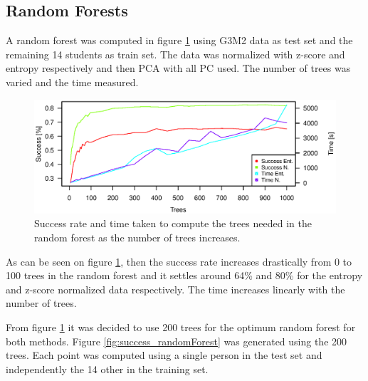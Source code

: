 \subsection{Random Forests}

A random forest was computed in figure \ref{fig:success_time_vs_trees_randomForest} using G3M2 data as test set and the remaining 14 students as train set. 
The data was normalized with z-score and entropy respectively and then PCA with all PC used.
The number of trees was varied and the time measured.

\begin{figure}[H]
\centering
\includegraphics[width = 0.95 \textwidth]{graphics/successRate_randomForest}
\caption{Success rate and time taken to compute the trees needed in the random forest as the number of trees increases.}
\label{fig:success_time_vs_trees_randomForest}
\end{figure}

As can be seen on figure \ref{fig:success_time_vs_trees_randomForest}, then the success rate increases drastically from 0 to 100 trees in the random forest and it settles around 64\% and 80\% for the entropy and z-score normalized data respectively.
The time increases linearly with the number of trees.

From figure \ref{fig:success_time_vs_trees_randomForest} it was decided to use 200 trees for the optimum random forest for both methods.
Figure \ref{fig:success_randomForest} was generated using the 200 trees.
Each point was computed using a single person in the test set and independently the 14 other in the training set.

